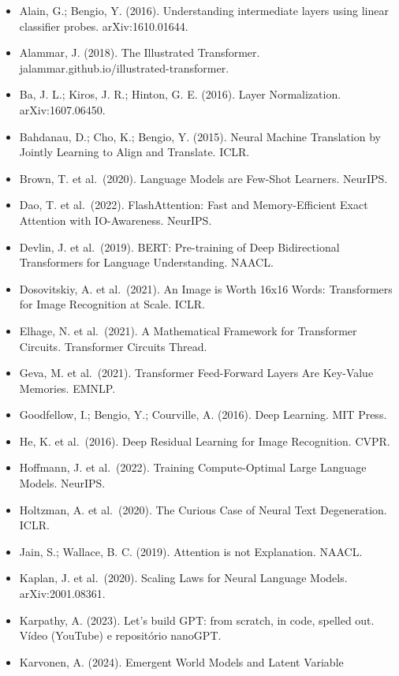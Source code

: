 \documentclass[
  11pt,
]{article}
\providecommand{\tightlist}{%
  \setlength{\itemsep}{0pt}\setlength{\parskip}{0pt}}
\begin{document}
\begin{itemize}
\tightlist
\item
  Alain, G.; Bengio, Y. (2016). Understanding intermediate layers using
  linear classifier probes. arXiv:1610.01644.
\item
  Alammar, J. (2018). The Illustrated Transformer.
  jalammar.github.io/illustrated-transformer.
\item
  Ba, J. L.; Kiros, J. R.; Hinton, G. E. (2016). Layer Normalization.
  arXiv:1607.06450.
\item
  Bahdanau, D.; Cho, K.; Bengio, Y. (2015). Neural Machine Translation
  by Jointly Learning to Align and Translate. ICLR.
\item
  Brown, T. et al.~(2020). Language Models are Few-Shot Learners.
  NeurIPS.
\item
  Dao, T. et al.~(2022). FlashAttention: Fast and Memory-Efficient Exact
  Attention with IO-Awareness. NeurIPS.
\item
  Devlin, J. et al.~(2019). BERT: Pre-training of Deep Bidirectional
  Transformers for Language Understanding. NAACL.
\item
  Dosovitskiy, A. et al.~(2021). An Image is Worth 16x16 Words:
  Transformers for Image Recognition at Scale. ICLR.
\item
  Elhage, N. et al.~(2021). A Mathematical Framework for Transformer
  Circuits. Transformer Circuits Thread.
\item
  Geva, M. et al.~(2021). Transformer Feed-Forward Layers Are Key-Value
  Memories. EMNLP.
\item
  Goodfellow, I.; Bengio, Y.; Courville, A. (2016). Deep Learning. MIT
  Press.
\item
  He, K. et al.~(2016). Deep Residual Learning for Image Recognition.
  CVPR.
\item
  Hoffmann, J. et al.~(2022). Training Compute-Optimal Large Language
  Models. NeurIPS.
\item
  Holtzman, A. et al.~(2020). The Curious Case of Neural Text
  Degeneration. ICLR.
\item
  Jain, S.; Wallace, B. C. (2019). Attention is not Explanation. NAACL.
\item
  Kaplan, J. et al.~(2020). Scaling Laws for Neural Language Models.
  arXiv:2001.08361.
\item
  Karpathy, A. (2023). Let's build GPT: from scratch, in code, spelled
  out. Vídeo (YouTube) e repositório nanoGPT.
\item
  Karvonen, A. (2024). Emergent World Models and Latent Variable

\end{itemize}
\end{document}
